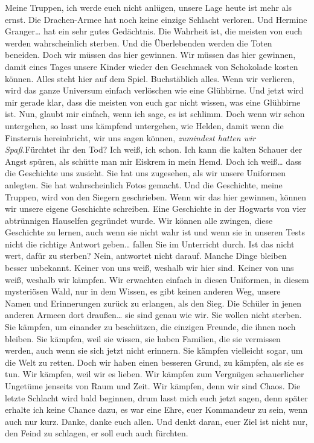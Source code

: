 Meine Truppen, ich werde euch nicht anlügen, unsere Lage heute ist mehr als ernst. Die Drachen-Armee hat noch keine einzige Schlacht verloren. Und Hermine Granger… hat ein sehr gutes Gedächtnis. Die Wahrheit ist, die meisten von euch werden wahrscheinlich sterben. Und die Überlebenden werden die Toten beneiden. Doch wir müssen das hier gewinnen. Wir müssen das hier gewinnen, damit eines Tages unsere Kinder wieder den Geschmack von Schokolade kosten können. Alles steht hier auf dem Spiel. Buchstäblich alles. Wenn wir verlieren, wird das ganze Universum einfach verlöschen wie eine Glühbirne. Und jetzt wird mir gerade klar, dass die meisten von euch gar nicht wissen, was eine Glühbirne ist. Nun, glaubt mir einfach, wenn ich sage, es ist schlimm. Doch wenn wir schon untergehen, so lasst uns kämpfend untergehen, wie Helden, damit wenn die Finsternis hereinbricht, wir uns sagen können, \emph{zumindest hatten wir Spaß.}Fürchtet ihr den Tod? Ich weiß, ich schon. Ich kann die kalten Schauer der Angst spüren, als schütte man mir Eiskrem in mein Hemd. Doch ich weiß… dass die Geschichte uns zusieht. Sie hat uns zugesehen, als wir unsere Uniformen anlegten. Sie hat wahrscheinlich Fotos gemacht. Und die Geschichte, meine Truppen, wird von den Siegern geschrieben. Wenn wir das hier gewinnen, können wir unsere eigene Geschichte schreiben. Eine Geschichte in der Hogwarts von vier abtrünnigen Hauselfen gegründet wurde. Wir können alle zwingen, diese Geschichte zu lernen, auch wenn sie nicht wahr ist und wenn sie in unseren Tests nicht die richtige Antwort geben… fallen Sie im Unterricht durch. Ist das nicht wert, dafür zu sterben? Nein, antwortet nicht darauf. Manche Dinge bleiben besser unbekannt. Keiner von uns weiß, weshalb wir hier sind. Keiner von uns weiß, weshalb wir kämpfen. Wir erwachten einfach in diesen Uniformen, in diesem mysteriösen Wald, nur in dem Wissen, es gibt keinen anderen Weg, unsere Namen und Erinnerungen zurück zu erlangen, als den Sieg. Die Schüler in jenen anderen Armeen dort draußen… sie sind genau wie wir. Sie wollen nicht sterben. Sie kämpfen, um einander zu beschützen, die einzigen Freunde, die ihnen noch bleiben. Sie kämpfen, weil sie wissen, sie haben Familien, die sie vermissen werden, auch wenn sie sich jetzt nicht erinnern. Sie kämpfen vielleicht sogar, um die Welt zu retten. Doch wir haben einen besseren Grund, zu kämpfen, als sie es tun. Wir kämpfen, weil wir es lieben. Wir kämpfen zum Vergnügen schauerlicher Ungetüme jenseits von Raum und Zeit. Wir kämpfen, denn wir sind Chaos. Die letzte Schlacht wird bald beginnen, drum lasst mich euch jetzt sagen, denn später erhalte ich keine Chance dazu, es war eine Ehre, euer Kommandeur zu sein, wenn auch nur kurz. Danke, danke euch allen. Und denkt daran, euer Ziel ist nicht nur, den Feind zu schlagen, er soll euch auch fürchten.


